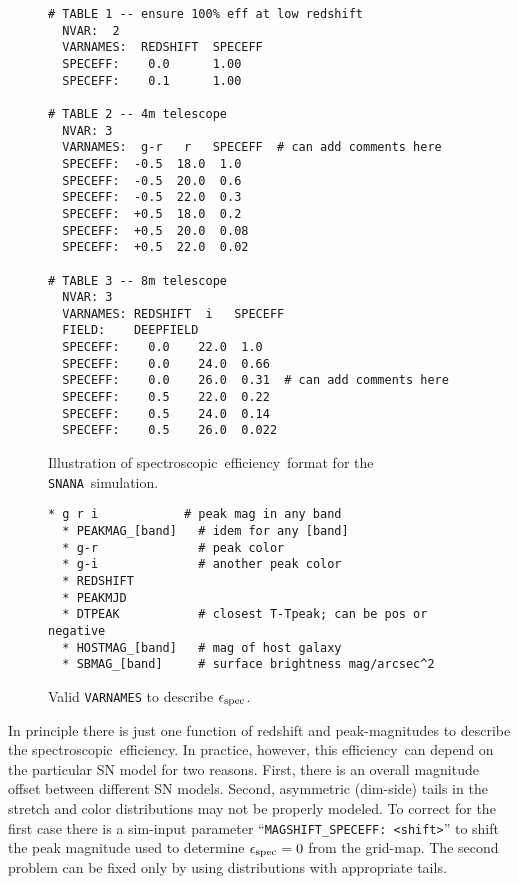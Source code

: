\documentclass[12pt]{article}
\newcommand{\snana}{{\tt SNANA}}
\newcommand{\eff}{efficiency}
\newcommand{\simeffspec}{\epsilon_{\rm spec}}
\newcommand{\spec}{spectroscopic}
\begin{document}
{%
\begin{figure}[hb] 
\begin{center}
\caption{Illustration of \spec\ \eff\ format for the \snana\ simulation.}
\label{fig:speceff}
\begin{Verbatim}[frame=single]
# TABLE 1 -- ensure 100% eff at low redshift
  NVAR:  2  
  VARNAMES:  REDSHIFT  SPECEFF
  SPECEFF:    0.0      1.00
  SPECEFF:    0.1      1.00

# TABLE 2 -- 4m telescope
  NVAR: 3
  VARNAMES:  g-r   r   SPECEFF  # can add comments here
  SPECEFF:  -0.5  18.0  1.0
  SPECEFF:  -0.5  20.0  0.6
  SPECEFF:  -0.5  22.0  0.3
  SPECEFF:  +0.5  18.0  0.2
  SPECEFF:  +0.5  20.0  0.08
  SPECEFF:  +0.5  22.0  0.02

# TABLE 3 -- 8m telescope
  NVAR: 3
  VARNAMES: REDSHIFT  i   SPECEFF  
  FIELD:    DEEPFIELD
  SPECEFF:    0.0    22.0  1.0
  SPECEFF:    0.0    24.0  0.66
  SPECEFF:    0.0    26.0  0.31  # can add comments here
  SPECEFF:    0.5    22.0  0.22
  SPECEFF:    0.5    24.0  0.14
  SPECEFF:    0.5    26.0  0.022
\end{Verbatim} 
\end{center} 
\end{figure}


\begin{figure}[hb] 
\begin{center}
\caption{ Valid {\tt VARNAMES} to describe $\simeffspec$. }
\label{fig:speceff_varnames}
\begin{Verbatim}[frame=single]
  * g r i            # peak mag in any band
  * PEAKMAG_[band]   # idem for any [band]
  * g-r              # peak color
  * g-i              # another peak color
  * REDSHIFT
  * PEAKMJD      
  * DTPEAK           # closest T-Tpeak; can be pos or negative
  * HOSTMAG_[band]   # mag of host galaxy
  * SBMAG_[band]     # surface brightness mag/arcsec^2
\end{Verbatim}
\end{center}
\end{figure}



In principle there is just one function of redshift and
peak-magnitudes to describe the \spec\ \eff. In practice,
however, this \eff\ can depend on the particular SN model
for two reasons. First, there is an overall magnitude offset
between different SN models. Second, asymmetric 
(dim-side) tails in the stretch and color distributions
may not be properly modeled. To correct for the first 
case there is a sim-input parameter 
``{\tt MAGSHIFT\_SPECEFF: <shift>}'' 
to shift the peak magnitude used to determine $\simeffspec=0$
from the grid-map.  The second problem can be fixed only
by using distributions with appropriate tails.



}
\end{document}

